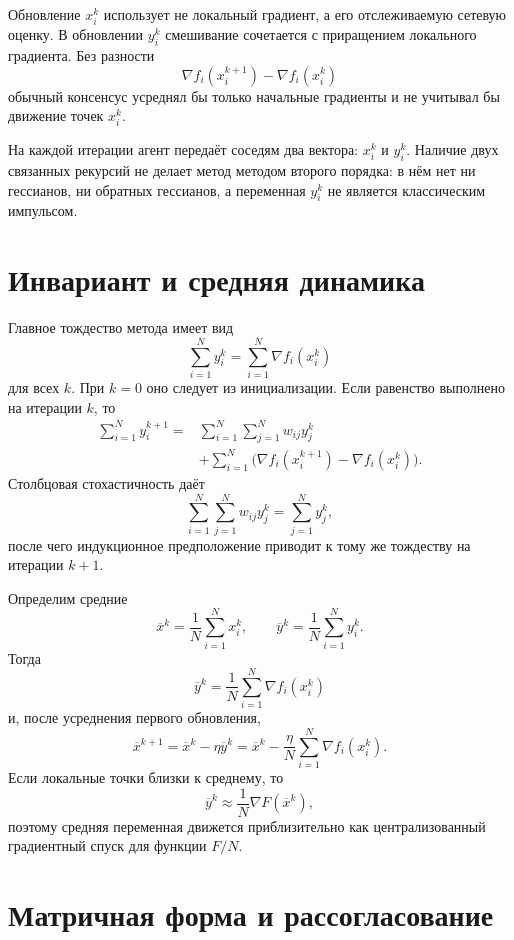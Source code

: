 Обновление \(x_i^k\) использует не локальный градиент, а его
отслеживаемую сетевую оценку. В обновлении \(y_i^k\) смешивание
сочетается с приращением локального градиента. Без разности
\[
    \nabla f_i(x_i^{k+1})-\nabla f_i(x_i^k)
\]
обычный консенсус усреднял бы только начальные градиенты и не учитывал
бы движение точек \(x_i^k\).

На каждой итерации агент передаёт соседям два вектора: \(x_i^k\) и
\(y_i^k\). Наличие двух связанных рекурсий не делает метод методом
второго порядка: в нём нет ни гессианов, ни обратных гессианов, а
переменная \(y_i^k\) не является классическим импульсом.

\section{Инвариант и средняя динамика}

Главное тождество метода имеет вид
\[
    \sum_{i=1}^{N}y_i^k
    =
    \sum_{i=1}^{N}\nabla f_i(x_i^k)
\]
для всех \(k\). При \(k=0\) оно следует из инициализации. Если
равенство выполнено на итерации \(k\), то
\[
\begin{aligned}
    \sum_{i=1}^{N}y_i^{k+1}
    ={}&
    \sum_{i=1}^{N}\sum_{j=1}^{N}w_{ij}y_j^k
    \\
    &+
    \sum_{i=1}^{N}
    \bigl(
        \nabla f_i(x_i^{k+1})
        -
        \nabla f_i(x_i^k)
    \bigr).
\end{aligned}
\]
Столбцовая стохастичность даёт
\[
    \sum_{i=1}^{N}\sum_{j=1}^{N}w_{ij}y_j^k
    =
    \sum_{j=1}^{N}y_j^k,
\]
после чего индукционное предположение приводит к тому же тождеству на
итерации \(k+1\).

Определим средние
\[
    \overline x^k
    =
    \frac1N\sum_{i=1}^{N}x_i^k,
    \qquad
    \overline y^k
    =
    \frac1N\sum_{i=1}^{N}y_i^k.
\]
Тогда
\[
    \overline y^k
    =
    \frac1N
    \sum_{i=1}^{N}\nabla f_i(x_i^k)
\]
и, после усреднения первого обновления,
\[
    \overline x^{k+1}
    =
    \overline x^k-\eta\overline y^k
    =
    \overline x^k
    -
    \frac{\eta}{N}
    \sum_{i=1}^{N}\nabla f_i(x_i^k).
\]
Если локальные точки близки к среднему, то
\[
    \overline y^k
    \approx
    \frac1N\nabla F(\overline x^k),
\]
поэтому средняя переменная движется приблизительно как
централизованный градиентный спуск для функции \(F/N\).

\section{Матричная форма и рассогласование}

